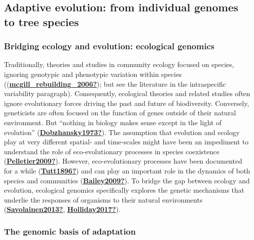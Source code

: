 \documentclass[12pt,twoside,a4paper, a]{article}
\begin{document}
\hypertarget{adaptive-evolution-from-individual-genomes-to-tree-species}{%
\subsection{Adaptive evolution: from individual genomes to tree species}\label{adaptive-evolution-from-individual-genomes-to-tree-species}}

\hypertarget{bridging-ecology-and-evolution-ecological-genomics}{%
\subsubsection{Bridging ecology and evolution: ecological genomics}\label{bridging-ecology-and-evolution-ecological-genomics}}

Traditionally, theories and studies in community ecology focused on species, ignoring genotypic and phenotypic variation within species ((\protect\hyperlink{ref-mcgill_rebuilding_2006}{\textbf{mcgill\_rebuilding\_2006?}}); but see the literature in the intraspecific variability paragraph).
Consequently, ecological theories and related studies often ignore evolutionary forces driving the past and future of biodiversity.
Conversely, geneticists are often focused on the function of genes outside of their natural environment.
But ``nothing in biology makes sense except in the light of evolution'' (\protect\hyperlink{ref-Dobzhansky1973}{\textbf{Dobzhansky1973?}}).
The assumption that evolution and ecology play at very different spatial- and time-scales might have been an impediment to understand the role of eco-evolutionary processes in species coexistence (\protect\hyperlink{ref-Pelletier2009}{\textbf{Pelletier2009?}}).
However, eco-evolutionary processes have been documented for a while (\protect\hyperlink{ref-Tutt1896}{\textbf{Tutt1896?}}) and can play an important role in the dynamics of both species and communities (\protect\hyperlink{ref-Bailey2009}{\textbf{Bailey2009?}}).
To bridge the gap between ecology and evolution, ecological genomics specifically explores the genetic mechanisms that underlie the responses of organisms to their natural environments (\protect\hyperlink{ref-Savolainen2013}{\textbf{Savolainen2013?}}, \protect\hyperlink{ref-Holliday2017}{\textbf{Holliday2017?}}).

\hypertarget{the-genomic-basis-of-adaptation}{%
\subsubsection{The genomic basis of adaptation}\label{the-genomic-basis-of-adaptation}}
\end{document}
